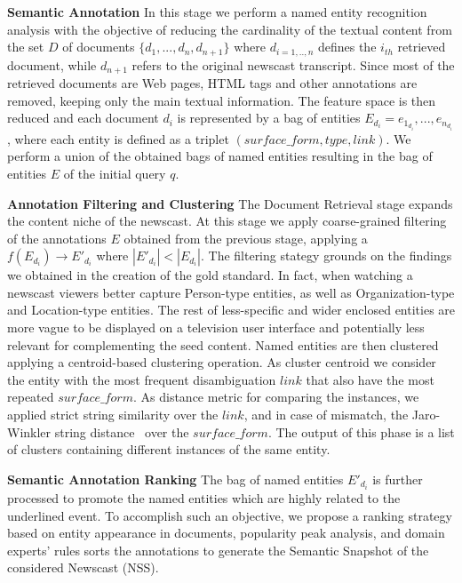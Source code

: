 \documentclass{llncs}
\begin{document}
{\bf Semantic Annotation} In this stage we perform a named entity recognition analysis with the objective of reducing the cardinality of the textual content from the set $D$ of documents $\{d_1, ..., d_n, d_{n+1}\}$ where $d_{i=1,..,n}$ defines the $i_{th}$ retrieved document, while $d_{n+1}$ refers to the original newscast transcript. Since most of the retrieved documents are Web pages, HTML tags and other annotations are removed, keeping only the main textual information. The feature space is then reduced and each document $d_i$ is represented by a bag of entities $E_{d_i}={e_{1_{d_i}}, ..., e_{n_{d_i}}}$, where each entity is defined as a triplet $(surface\_form, type, link)$. We perform a union of the obtained bags of named entities resulting in the bag of entities $E$ of the initial query $q$. 

{\bf Annotation Filtering and Clustering} The Document Retrieval stage expands the content niche of the newscast. At this stage we apply coarse-grained filtering of the annotations $E$ obtained from the previous stage, applying a $f\left ( E_{d_i}\right )\rightarrow  E'_{d_i}$ where $\left |E'_{d_i}  \right | < \left |E_{d_i}  \right |$. The filtering stategy grounds on the findings we obtained in the creation of the gold standard. In fact, when watching a newscast viewers better capture Person-type entities, as well as Organization-type and Location-type entities. The rest of less-specific and wider enclosed entities are more vague to be displayed on a television user interface and potentially less relevant for complementing the seed content. 
Named entities are then clustered applying a centroid-based clustering operation. As cluster centroid we consider the entity with the most frequent disambiguation $link$ that also have the most repeated $surface\_form$. As distance metric for comparing the instances, we applied strict string similarity over the $link$, and in case of mismatch, the Jaro-Winkler string distance~\cite{winkler2006overview} over the $surface\_form$. The output of this phase is a list of clusters containing different instances of the same entity.

{\bf Semantic Annotation Ranking}
The bag of named entities $E'_{d_i}$ is further processed to promote the named entities which are highly related to the underlined event. To accomplish such an objective, we propose a ranking strategy based on entity appearance in documents, popularity peak analysis, and domain experts' rules sorts the annotations to generate the Semantic Snapshot of the considered Newscast (NSS).
\end{document}
